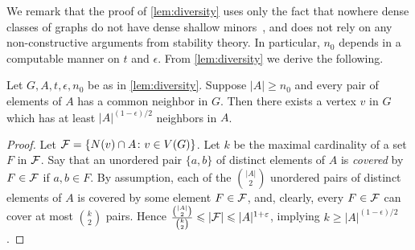 We remark that the proof of \cref{lem:diversity} uses only the fact that
nowhere dense classes of graphs do not have dense 
shallow minors~\cite{dvorak2007asymptotical,jiang2011compact}, and does not rely on any non-constructive arguments from stability theory.
In particular, $n_0$ depends in a computable manner on $t$ and $\epsilon$.
From \cref{lem:diversity} we derive the following.

\begin{corollary}\label{cor:diversity}
  Let $G,A,t,\epsilon,n_0$ be as in \cref{lem:diversity}.
  Suppose $|A|\ge n_0$ and every pair of elements of $A$ has a common neighbor in $G$.
  Then there exists a vertex $v$ in $G$ which has at least $|A|^{(1-\epsilon)/2}$ neighbors in $A$.
\end{corollary}
\begin{proof}Let ${\cal F}=\set{N(v)\cap A\colon v\in V(G)}$. 
  Let $k$ be the maximal cardinality of a set $F$ in ${\cal F}$.
  Say that an unordered pair $\{a,b\}$ of distinct elements of $A$ is \emph{covered} by $F\in {\cal F}$
  if  $a,b\in F$.
  By assumption, each of the $\binom{|A|}{2}$ unordered pairs of distinct elements of $A$ is covered by some element $F\in {\cal F}$, and,
  clearly, every $F\in {\cal F}$ can cover at most $\binom{k}{2}$ pairs. 
  Hence $\frac{\binom{|A|}{2}}{\binom{k}{2}}\leq |{\cal F}|\le  |A|^{1+\epsilon}$, implying $k\ge |A|^{(1-\epsilon)/2}$.
\end{proof}

\begin{comment}
\begin{corollary}\label{cor:biversity}
    For every positive real $\alpha<\frac 1 2$ and integer $t\in\N$ there exists an integer $\ell_0$ with the following property.
  Let $G$ be a graph such that $K_t\not\minor_2 G$
  and let
  $A$ be a $1$-independent subset of $G$ with $|A|\ge \ell_0$ such that every pair of vertices in $A$ has a common neighbor in $G$.
   Then there is a vertex $v\in G$
  with at least $|A|^{\alpha}$ neighbors in $A$.
\end{corollary}
\begin{proof}\label{pf:}
  Define $H$ to be the bipartite graph induced 
  by $G$, with partite sets $A$ and $V(G)-A$; that is,  $v\in A$ and $w\in V(G)-A$ are adjacent in $H$ iff they are in $G$. 
  We claim that $K_{2t^2}\not\minor_1 H$. Indeed, it is easy to see that 
  since $H$ is bipartite, $K_{2t^2}\minor_1 H$ would imply that $H$ contains the 
  complete bipartite graph $K_{t^2,t^2}$,  which, in turn, implying that $K_{t}\minor_2 G$, contrary to our assumption.  
  
  Let $\ell_0$
    be the value $n_0$ from~\cref{lem:diversity} applied to $2t^2$ in place of $t$ and $\epsilon$ such that $(1-\epsilon)/2=\alpha$. Applying~\cref{cor:diversity} to $H,2t,\epsilon,\ell_0$, we conclude that if every pair of elements of $A$ has a common neighbor in $G$
    (hence also in $H$), then there is a vertex $v$
    of $H$ with at least $|A|^{\alpha}$ neighbors in~$A$.
\end{proof}
\end{comment}

